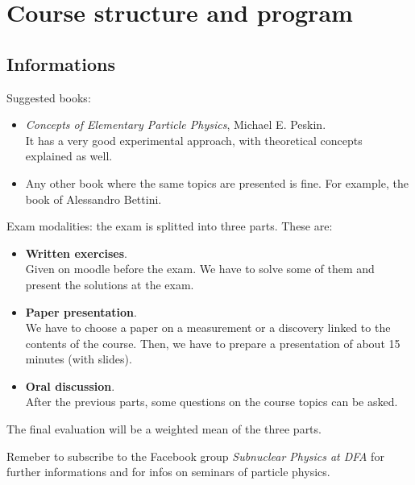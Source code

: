 \documentclass[../../main/main.tex]{subfiles}
\begin{document}
\chapter*{Course structure and program}


\section*{Informations}
Suggested books:
\begin{itemize}
    \item \emph{Concepts of Elementary Particle Physics}, Michael E. Peskin.\\
        It has a very good experimental approach, with theoretical concepts explained as well.
    \item Any other book where the same topics are presented is fine. For example, the book of Alessandro Bettini.
\end{itemize}

Exam modalities: the exam is splitted into three parts. These are:
\begin{itemize}
	\item \textbf{Written exercises}.\\
		Given on moodle before the exam. We have to solve some of them and present the solutions at the exam.
	\item \textbf{Paper presentation}.\\
		We have to choose a paper on a measurement or a discovery linked to the contents of the course. Then, we have to prepare a presentation of about 15 minutes (with slides).
	\item \textbf{Oral discussion}.\\
		After the previous parts, some questions on the course topics can be asked.
\end{itemize}
The final evaluation will be a weighted mean of the three parts.

Remeber to subscribe to the Facebook group \emph{Subnuclear Physics at DFA} for further informations and for infos on seminars of particle physics.
\end{document}
